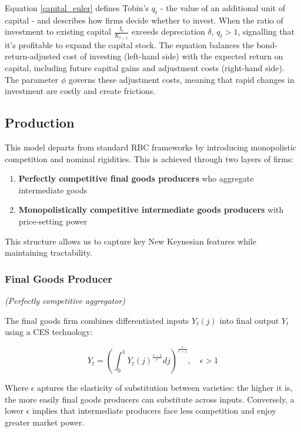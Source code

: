 \documentclass[11pt,preprint]{elsarticle}
\numberwithin{equation}{section}
\numberwithin{figure}{section}
\numberwithin{table}{section}
\def\tightlist{} %
\begin{document}
Equation \ref{capital_euler} defines Tobin's \(q_t\) - the value of an
additional unit of capital - and describes how firms decide whether to
invest. When the ratio of investment to existing capital
\(\frac{I_t}{K_{t-1}}\) exceeds depreciation \(\delta\), \(q_t > 1\),
signalling that it's profitable to expand the capital stock. The
equation balances the bond-return-adjusted cost of investing (left-hand
side) with the expected return on capital, including future capital
gains and adjustment costs (right-hand side). The parameter \(\phi\)
governs these adjustment costs, meaning that rapid changes in investment
are costly and create frictions.

\subsection{Production}\label{production}

This model departs from standard RBC frameworks by introducing
monopolistic competition and nominal rigidities. This is achieved
through two layers of firms:

\begin{enumerate}
\def\labelenumi{\arabic{enumi}.}
\tightlist
\item
  \textbf{Perfectly competitive final goods producers} who aggregate
  intermediate goods\\
\item
  \textbf{Monopolistically competitive intermediate goods producers}
  with price-setting power
\end{enumerate}

This structure allows us to capture key New Keynesian features while
maintaining tractability.

\subsubsection{Final Goods Producer}\label{final-goods-producer}

\emph{(Perfectly competitive aggregator)}

The final goods firm combines differentiated inputs \(Y_t(j)\) into
final output \(Y_t\) using a CES technology:

\begin{equation}  
Y_t = \left( \int_0^1 Y_t(j)^{\frac{\epsilon-1}{\epsilon}}  dj \right)^{\frac{\epsilon}{\epsilon-1}}, \quad \epsilon > 1  
\label{ces_production}  
\end{equation}

Where \(\epsilon\) aptures the elasticity of substitution between
varieties: the higher it is, the more easily final goods producers can
substitute across inputs. Conversely, a lower \(\epsilon\) implies that
intermediate producers face less competition and enjoy greater market
power.
\end{document}
